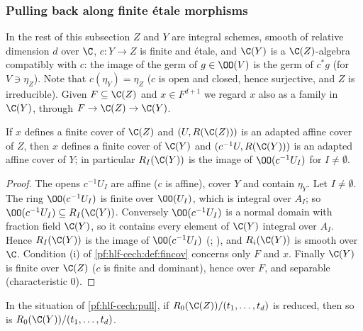 \subsubsection{Pulling back along finite \'etale morphisms}

In the rest of this subsection $Z$ and $Y$ are integral schemes, smooth of relative dimension $d$ over $\C$, $c\colon Y\to Z$ is finite and
\'etale, and $\C(Y)$ is a $\C(Z)$-algebra compatibly with $c$: the image of the germ of $g\in\OO(V)$ is the germ of $c^*g$ (for $V\ni\eta_Z$). Note
that $c(\eta_Y)=\eta_Z$ ($c$ is open and closed, hence surjective, and $Z$ is irreducible). Given $F\subseteq\C(Z)$ and $x\in F^{d+1}$ we regard $x$
also as a family in $\C(Y)$, through $F\to\C(Z)\to\C(Y)$.

\begin{proposition}\label{pf:hlf-cech:pull}
If $x$ defines a finite cover of $\C(Z)$ and $(U,R(\C(Z)))$ is an adapted affine cover of $Z$, then $x$ defines a finite cover of $\C(Y)$ and
$(c^{-1}U,R(\C(Y)))$ is an adapted affine cover of $Y$; in particular $R_I(\C(Y))$ is the image of $\OO(c^{-1}U_I)$ for $I\ne\emptyset$.
\end{proposition}

\begin{proof}
The opens $c^{-1}U_I$ are affine ($c$ is affine), cover $Y$ and contain $\eta_Y$. Let $I\ne\emptyset$. The ring $\OO(c^{-1}U_I)$ is finite over
$\OO(U_I)$, which is integral over $A_I$; so $\OO(c^{-1}U_I)\subseteq R_I(\C(Y))$. Conversely $\OO(c^{-1}U_I)$ is a normal domain with fraction field
$\C(Y)$, so it contains every element of $\C(Y)$ integral over $A_I$. Hence $R_I(\C(Y))$ is the image of $\OO(c^{-1}U_I)$
(; ), and $R_i(\C(Y))$ is smooth over
$\C$. Condition (i) of \cref{pf:hlf-cech:def:fincov} concerns only $F$ and $x$. Finally $\C(Y)$ is finite over $\C(Z)$ ($c$ is finite and
dominant), hence over $F$, and separable (characteristic $0$).
\end{proof}

\begin{proposition}\label{pf:hlf-cech:fieldext}
In the situation of \cref{pf:hlf-cech:pull}, if $R_0(\C(Z))/(t_1,\dots,t_d)$ is reduced, then so is $R_0(\C(Y))/(t_1,\dots,t_d)$.
\end{proposition}

